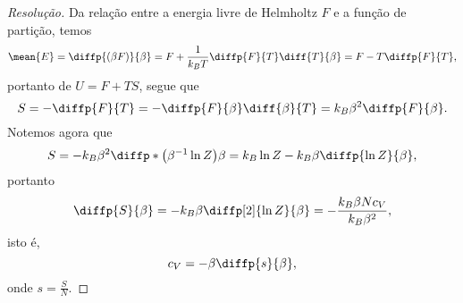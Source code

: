 \begin{proof}[Resolução]
    Da relação entre a energia livre de Helmholtz \(F\) e a função de partição, temos
    \begin{equation*}
        \mean{E} = \diffp{(\beta F)}{\beta} = F + \frac{1}{k_B T} \diffp{F}{T} \diff{T}{\beta} = F - T \diffp{F}{T},
    \end{equation*}
    portanto de \(U = F + TS\), segue que
    \begin{equation*}
        S = - \diffp{F}{T} = -\diffp{F}{\beta}\diff{\beta}{T} = k_B \beta^2 \diffp{F}{\beta}.
    \end{equation*}
    Notemos agora que
    \begin{equation*}
        S = -k_B \beta^2 \diffp*{\left(\beta^{-1} \ln Z\right)}{\beta} = k_B \ln Z - k_B \beta \diffp{\ln{Z}}{\beta},
    \end{equation*}
    portanto
    \begin{equation*}
        \diffp{S}{\beta} = -k_B \beta \diffp[2]{\ln Z}{\beta} = -\frac{k_B \beta N c_V}{k_B \beta^2},
    \end{equation*}
    isto é,
    \begin{equation*}
        c_V = -\beta \diffp{s}{\beta},
    \end{equation*}
    onde \(s = \frac{S}{N}.\)
\end{proof}
